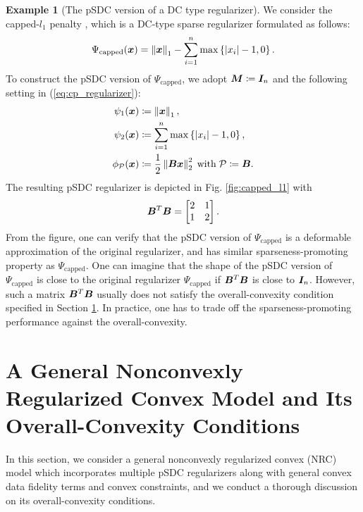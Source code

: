 \documentclass[lettersize,journal]{IEEEtran}
\theoremstyle{plain}%
\theoremstyle{definition}
\newtheorem{example}{Example}
\theoremstyle{remark}
\begin{document}
\begin{example}[The pSDC version of a DC type regularizer]\label{exp:capped_l1}
We consider the capped-$l_1$ penalty \cite{peleg2008}, which is a DC-type sparse regularizer formulated as follows:
\begin{equation*}
\Psi_{\mathrm{capped}}(\bm{x})=\left\| \bm{x} \right\|_1-\sum_{i=1}^n\max\left\{ |x_i|-1,0 \right\}.
\end{equation*}
To construct the pSDC version of $\Psi_{\mathrm{capped}}$, we adopt $\bm{M}\coloneqq \bm{I}_n$ and the following setting in (\ref{eq:cp_regularizer}):
\begin{align*}
\psi_1(\bm{x}) &\coloneqq \left\| \bm{x} \right\|_1, \\
\psi_2(\bm{x}) &\coloneqq \sum_{i=1}^n\max\left\{ |x_i|-1,0 \right\},\\
\phi_{\mathcal{P}}(\bm{x}) &\coloneqq \frac{1}{2}\left\| \bm{B}\bm{x} \right\|^2_2 \;\mathrm{with}\; \mathcal{P}\coloneqq \bm{B}.
\end{align*}
The resulting pSDC regularizer is depicted in Fig. \ref{fig:capped_l1} with 
\[\bm{B}^T\bm{B}=\begin{bmatrix}2 & 1\\ 1 & 2\end{bmatrix}.\] From the figure, one can verify that the pSDC version of $\Psi_{\mathrm{capped}}$ is a deformable approximation of the original regularizer, and has similar sparseness-promoting property as $\Psi_{\mathrm{capped}}$. One can imagine that the shape of the pSDC version of $\Psi_{\mathrm{capped}}$ is close to the original regularizer $\Psi_{\mathrm{capped}}$ if $\bm{B}^T\bm{B}$ is close to $\bm{I}_n$. However, such a matrix $\bm{B}^T\bm{B}$ usually does not satisfy the overall-convexity condition specified in Section \ref{sec:overall_convexity_conditions}. In practice, one has to trade off the sparseness-promoting performance against the overall-convexity.
\end{example}


\section{A General Nonconvexly Regularized Convex Model and Its Overall-Convexity Conditions}
\label{sec:overall_convexity_conditions}

In this section, we consider a general nonconvexly regularized convex (NRC) model which incorporates multiple pSDC regularizers along with general convex data fidelity terms and convex constraints, and we conduct a thorough discussion on its overall-convexity conditions.
\end{document}
